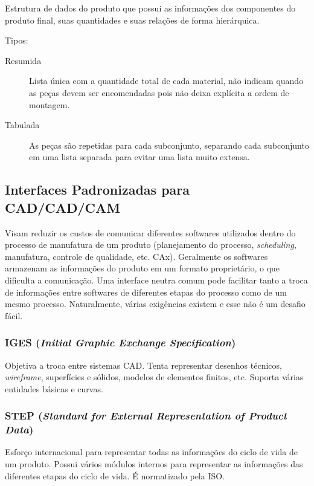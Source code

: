 \documentclass[a4paper]{report}
\begin{document}
Estrutura de dados do produto que possui as informações dos componentes do produto final, suas quantidades e suas relações de forma hierárquica.

Tipos:
\begin{description}
    \item[Resumida] Lista única com a quantidade total de cada material, não indicam quando as peças devem ser encomendadas pois não deixa explícita a ordem de montagem.
    \item[Tabulada] As peças são repetidas para cada subconjunto, separando cada subconjunto em uma lista separada para evitar uma lista muito extensa.
\end{description}

\subsection*{Interfaces Padronizadas para CAD/CAD/CAM}

Visam reduzir os custos de comunicar diferentes softwares utilizados dentro do processo de manufatura de um produto (planejamento do processo, \emph{scheduling}, manufatura, controle de qualidade, etc. CAx). Geralmente os softwares armazenam as informações do produto em um formato proprietário, o que dificulta a comunicação. Uma interface neutra comum pode facilitar tanto a troca de informações entre softwares de diferentes etapas do processo como de um mesmo processo. Naturalmente, várias exigências existem e esse não é um desafio fácil.

\subsubsection*{IGES (\emph{Initial Graphic Exchange Specification})}

Objetiva a troca entre sistemas CAD. Tenta representar desenhos técnicos, \emph{wireframe}, superfícies e sólidos, modelos de elementos finitos, etc. Suporta várias entidades básicas e curvas.

\subsubsection*{STEP (\emph{Standard for External Representation of Product Data})}

Esforço internacional para representar todas as informações do ciclo de vida de um produto. Possui vários módulos internos para representar as informações das diferentes etapas do ciclo de vida. É normatizado pela ISO.
\end{document}
